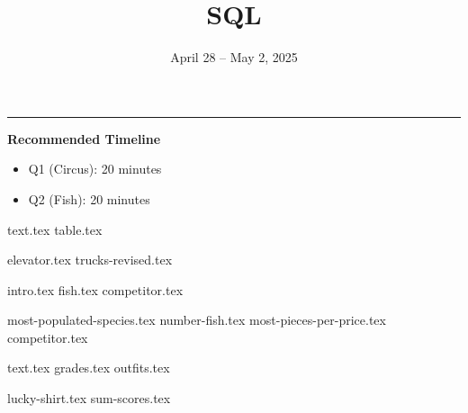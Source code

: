 \documentclass{exam}
\title{SQL}
\date{April 28 -- May 2, 2025}
\begin{document}
\maketitle\rule{\textwidth}{0.15em}

\begin{guide}
    \textbf{Recommended Timeline}
    \begin{itemize}
        \item Q1 (Circus): 20 minutes
        \item Q2 (Fish): 20 minutes
    \end{itemize}
\end{guide}

\begin{questions}

  \question
  {text.tex}
  {table.tex}
  \begin{parts}
    {elevator.tex}
    {trucks-revised.tex}
  \end{parts}
  
  \newpage
  \question 
  {intro.tex}
  {fish.tex}
  {competitor.tex}
  \begin{parts}
    {most-populated-species.tex}
    {number-fish.tex}
    {most-pieces-per-price.tex}
    {competitor.tex}
  \end{parts}

  \newpage
  \question
  {text.tex}
  {grades.tex}
  {outfits.tex}
  \begin{parts}
    {lucky-shirt.tex}
    {sum-scores.tex}
  \end{parts}
\end{questions}
\end{document}
